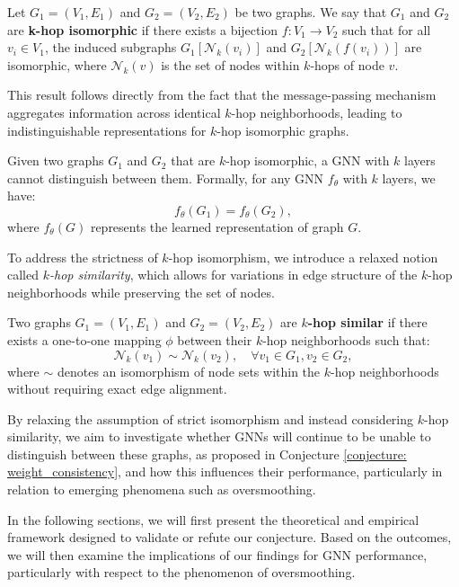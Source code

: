 \begin{definition}
Let $ G_1 = (V_1, E_1) $ and $ G_2 = (V_2, E_2) $ be two graphs. We say that $ G_1 $ and $ G_2 $ are \textbf{k-hop isomorphic} if there exists a bijection $ f: V_1 \to V_2 $ such that for all $ v_i \in V_1 $, the induced subgraphs $ G_1[\mathcal{N}_k(v_i)] $ and $ G_2[\mathcal{N}_k(f(v_i))] $ are isomorphic, where $ \mathcal{N}_k(v) $ is the set of nodes within $ k $-hops of node $ v $.
\end{definition}

This result follows directly from the fact that the message-passing mechanism aggregates information across identical $k$-hop neighborhoods, leading to indistinguishable representations for $k$-hop isomorphic graphs.

\begin{theorem}
Given two graphs $ G_1 $ and $ G_2 $ that are $ k $-hop isomorphic, a GNN with $ k $ layers cannot distinguish between them. Formally, for any GNN $ f_{\theta} $ with $ k $ layers, we have:
\[
f_{\theta}(G_1) = f_{\theta}(G_2),
\]
where $ f_{\theta}(G) $ represents the learned representation of graph $ G $.
\end{theorem}


To address the strictness of $ k $-hop isomorphism, we introduce a relaxed notion called \textit{$ k $-hop similarity}, which allows for variations in edge structure of the $ k $-hop neighborhoods while preserving the set of nodes.

\begin{definition}
Two graphs $ G_1 = (V_1, E_1) $ and $ G_2 = (V_2, E_2) $ are \textbf{$ k $-hop similar} if there exists a one-to-one mapping $ \phi $ between their $ k $-hop neighborhoods such that:
\[
\mathcal{N}_k(v_1) \sim \mathcal{N}_k(v_2), \quad \forall v_1 \in G_1, v_2 \in G_2,
\]
where $ \sim $ denotes an isomorphism of node sets within the $ k $-hop neighborhoods without requiring exact edge alignment.
\end{definition}

By relaxing the assumption of strict isomorphism and instead considering $k$-hop similarity, we aim to investigate whether GNNs will continue to be unable to distinguish between these graphs, as proposed in Conjecture \ref{conjecture: weight_consistency}, and how this influences their performance, particularly in relation to emerging phenomena such as oversmoothing.

In the following sections, we will first present the theoretical and empirical framework designed to validate or refute our conjecture. Based on the outcomes, we will then examine the implications of our findings for GNN performance, particularly with respect to the phenomenon of oversmoothing.


